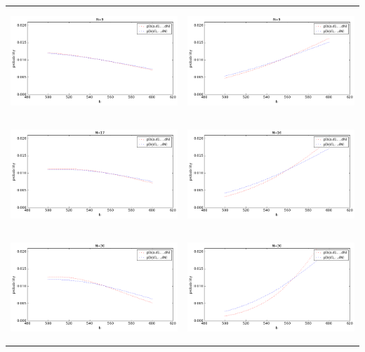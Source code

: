 \documentclass[12pt, a4paper]{article}
\begin{document}
\begin{center}
\begin{tabular}{ c  c }
  				\includegraphics[width=8cm, height=4cm]{graphs/m3_gen_n9.png} &
  				\includegraphics[width=8cm, height=4cm]{graphs/m4_gen_n9.png} \\
  				
  				\includegraphics[width=8cm, height=4cm]{graphs/m3_gen_n16.png} &
  				\includegraphics[width=8cm, height=4cm]{graphs/m4_gen_n16.png} \\
  				
  				\includegraphics[width=8cm, height=4cm]{graphs/m3_gen_n30.png} &
  				\includegraphics[width=8cm, height=4cm]{graphs/m4_gen_n30.png} \\
  				

\end{tabular}
\end{center}
\end{document}
